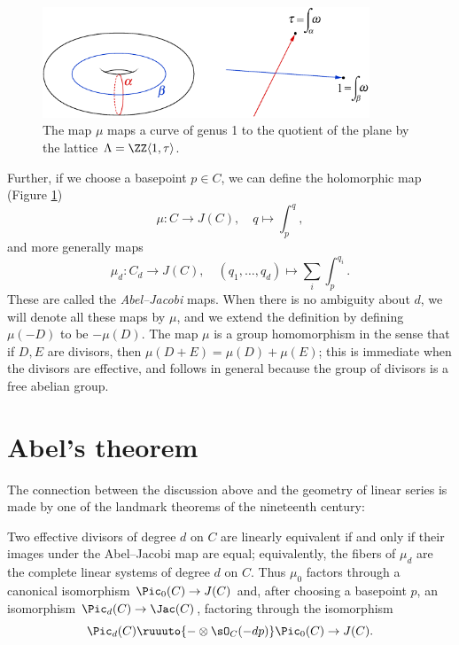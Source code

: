 \begin{figure}
\includegraphics[height=1.3in]{"main/Fig04-3"}
 \caption{The map $\mu$ maps a curve of genus 1 to the quotient of the plane by the lattice $\Lambda = \ZZ\langle 1,\tau\rangle$.}
\label{abeljacobi}
\end{figure}

Further, if we choose a basepoint  $p\in C$, we can define the holomorphic map (Figure \ref{abeljacobi})
%
$$
\mu  :  C  \to  J(C), \quad q\mapsto \int_{p}^{q},
$$
and more generally maps
$$
\mu_d
:  C_d  \to  J(C), \quad (q_1,\dots, q_d) \mapsto \sum_i \int_{p}^{q_i}.
$$
These 
are called the \emph{Abel--Jacobi} maps. When there is no
%
ambiguity about $d$, we will denote all these maps  by $\mu$,  and   
we extend the definition by defining $\mu(-D)$ to be $-\mu(D)$.
The map $\mu$ is a group homomorphism in the sense that if $D, E$ are divisors, then
$\mu (D+E) = \mu(D) + \mu(E)$; this is immediate when the divisors are effective, and 
follows in general because the group of divisors is a free abelian group.

\section{Abel's theorem}

The connection between the discussion above and the geometry of linear
series is made by one of the landmark theorems of the nineteenth century: 

\begin{theorem}\label{abel}
Two effective divisors of degree $d$ on $C$  are linearly
%
equivalent if and only if their images under the Abel--Jacobi map are
equal; 
equivalently,
the fibers of $\mu_d$ are
the complete linear systems of degree $d$ on $C$. Thus $\mu_0$ factors
through a canonical isomorphism
$\Pic_0(C) \to J(C)$ and, after choosing a basepoint $p$, an
isomorphism $\Pic_d(C) \to \nobreak\Jac(C)$, factoring through the isomorphism
$$
\Pic_d(C) \ruuuto {-\otimes \sO_C(-dp)} \Pic_0(C) \to J(C).
$$
\end{theorem}

